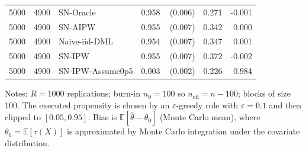 \documentclass[11pt]{article}
\numberwithin{equation}{section}
\newcommand{\mcse}[1]{{\footnotesize\,(#1)}}
\theoremstyle{plain}
\theoremstyle{definition}
\theoremstyle{remark}
\newcommand{\E}{\mathbb{E}}
\begin{document}
\begin{table}[!htbp]
\begin{threeparttable}
\begin{tabular}{@{}l r l r r r r@{}}
5000 & 4900 & SN-Oracle & 0.958 & \mcse{0.006} & 0.271 & -0.001 \\
5000 & 4900 & SN-AIPW & 0.955 & \mcse{0.007} & 0.342 & 0.000 \\
5000 & 4900 & Naive-iid-DML & 0.954 & \mcse{0.007} & 0.347 & 0.001 \\
5000 & 4900 & SN-IPW & 0.955 & \mcse{0.007} & 0.372 & -0.002 \\
5000 & 4900 & SN-IPW-Assume0p5 & 0.003 & \mcse{0.002} & 0.226 & 0.984 \\
\bottomrule
\end{tabular}
\begin{tablenotes}[flushleft]
\footnotesize
\item Notes: $R=1000$ replications; burn-in $n_0=100$ so $n_{\mathrm{eff}}=n-100$; blocks of size 100. The executed propensity is chosen by an $\varepsilon$-greedy rule with $\varepsilon=0.1$ and then clipped to $[0.05,0.95]$. Bias is $\E[\widehat\theta-\theta_0]$ (Monte Carlo mean), where $\theta_0=\E[\tau(X)]$ is approximated by Monte Carlo integration under the covariate distribution.
\end{tablenotes}
\end{threeparttable}
\end{table}
\end{document}
